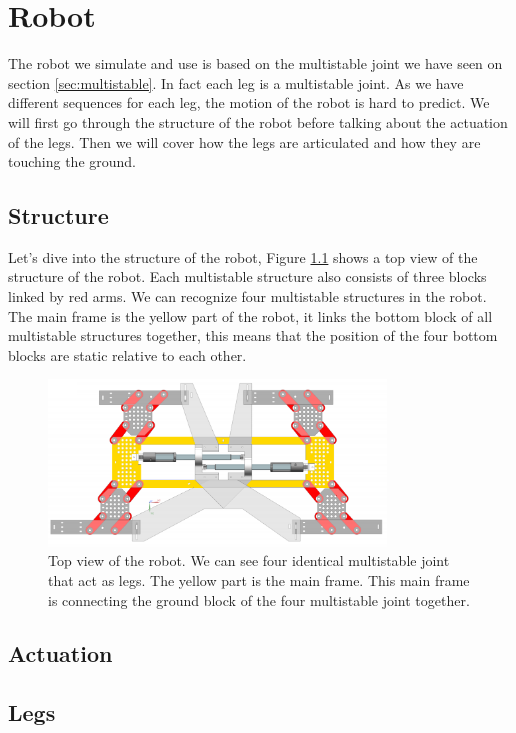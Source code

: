 \chapter{Robot}
    The robot we simulate and use is based on the multistable joint we have seen on section \ref{sec:multistable}. In fact each leg is a multistable joint. As we have different sequences for each leg, the motion of the robot is hard to predict. We will first go through the structure of the robot before talking about the actuation of the legs. Then we will cover how the legs are articulated and how they are touching the ground. 
    
    \section{Structure}
        Let's dive into the structure of the robot, Figure \ref{fig:robot_top_view} shows a top view of the structure of the robot. Each multistable structure also consists of three blocks linked by red arms. We can recognize four multistable structures in the robot. The main frame is the yellow part of the robot, it links the bottom block of all multistable structures together, this means that the position of the four bottom blocks are static relative to each other. 
        \begin{figure}
            \centering
            \includegraphics[width=0.8\textwidth]{images/top_view_robot.png}
            \caption{Top view of the robot. We can see four identical multistable joint that act as legs. The yellow part is the main frame. This main frame is connecting the ground block of the four multistable joint together. }
            \label{fig:robot_top_view}
        \end{figure}
    \section{Actuation}
    \section{Legs}